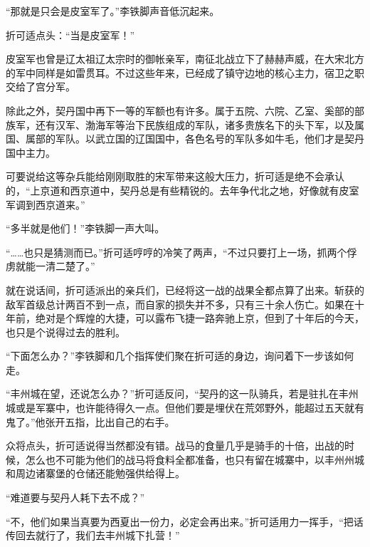 “那就是只会是皮室军了。”李铁脚声音低沉起来。

折可适点头：“当是皮室军！”

皮室军也曾是辽太祖辽太宗时的御帐亲军，南征北战立下了赫赫声威，在大宋北方的军中同样是如雷贯耳。不过这些年来，已经成了镇守边地的核心主力，宿卫之职交给了宫分军。

除此之外，契丹国中再下一等的军额也有许多。属于五院、六院、乙室、奚部的部族军，还有汉军、渤海军等治下民族组成的军队，诸多贵族名下的头下军，以及属国、属部的军队。以武立国的辽国国中，各色名号的军队多如牛毛，他们才是契丹国中主力。

可要说给这等杂兵能给刚刚取胜的宋军带来这般大压力，折可适是绝不会承认的，“上京道和西京道中，契丹总是有些精锐的。去年争代北之地，好像就有皮室军调到西京道来。”

“多半就是他们！”李铁脚一声大叫。

“……也只是猜测而已。”折可适哼哼的冷笑了两声，“不过只要打上一场，抓两个俘虏就能一清二楚了。”

就在说话间，折可适派出的亲兵们，已经将这一战的战果全都点算了出来。斩获的敌军首级总计两百不到一点，而自家的损失并不多，只有三十余人伤亡。如果在十年前，绝对是个辉煌的大捷，可以露布飞捷一路奔驰上京，但到了十年后的今天，也只是个说得过去的胜利。

“下面怎么办？”李铁脚和几个指挥使们聚在折可适的身边，询问着下一步该如何走。

“丰州城在望，还说怎么办？”折可适反问，“契丹的这一队骑兵，若是驻扎在丰州城或是军寨中，也许能待得久一点。但他们要是埋伏在荒郊野外，能超过五天就有鬼了。”他张开五指，比出自己的右手。

众将点头，折可适说得当然都没有错。战马的食量几乎是骑手的十倍，出战的时候，怎么也不可能为他们的战马将食料全都准备，也只有留在城寨中，以丰州州城和周边诸寨堡的仓储还能勉强供给得上。

“难道要与契丹人耗下去不成？”

“不，他们如果当真要为西夏出一份力，必定会再出来。”折可适用力一挥手，“把话传回去就行了，我们去丰州城下扎营！”


